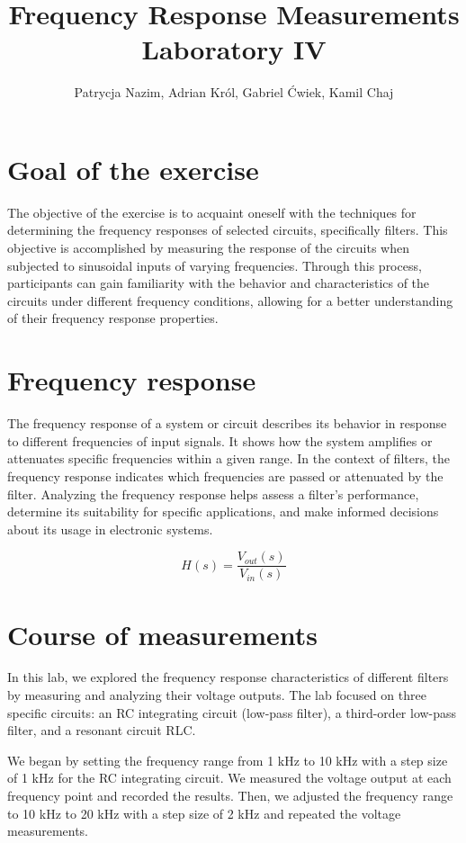 \documentclass[notitlepage, a4paper, 11pt]{article}
\title{Frequency Response Measurements\\
	\large Laboratory IV}
\author{Patrycja Nazim, Adrian Król, Gabriel Ćwiek, Kamil Chaj}
\date{}
\begin{document}
	\maketitle
	\section{Goal of the exercise}
	
	The objective of the exercise is to acquaint oneself with the techniques for determining the frequency responses of selected circuits, specifically filters. This objective is accomplished by measuring the response of the circuits when subjected to sinusoidal inputs of varying frequencies. Through this process, participants can gain familiarity with the behavior and characteristics of the circuits under different frequency conditions, allowing for a better understanding of their frequency response properties.
	
	\section{Frequency response}
	
	The frequency response of a system or circuit describes its behavior in response to different frequencies of input signals. It shows how the system amplifies or attenuates specific frequencies within a given range. In the context of filters, the frequency response indicates which frequencies are passed or attenuated by the filter. Analyzing the frequency response helps assess a filter's performance, determine its suitability for specific applications, and make informed decisions about its usage in electronic systems.
	
	\begin{equation}
		H(s) = \dfrac{V_{out}(s)}{V_{in}(s)}
	\end{equation}
	
	\section{Course of measurements}
	
	In this lab, we explored the frequency response characteristics of different filters by measuring and analyzing their voltage outputs. The lab focused on three specific circuits: an RC integrating circuit (low-pass filter), a third-order low-pass filter, and a resonant circuit RLC.
		
	We began by setting the frequency range from 1 kHz to 10 kHz with a step size of 1 kHz for the RC integrating circuit. We measured the voltage output at each frequency point and recorded the results. Then, we adjusted the frequency range to 10 kHz to 20 kHz with a step size of 2 kHz and repeated the voltage measurements.
	
\end{document}
